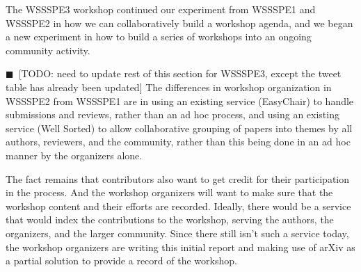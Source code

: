 \documentclass[11pt, oneside]{amsart}
\newcommand{\todo}[1]{{\color{blue}$\blacksquare$~\textsf{[TODO: #1]}}}
\begin{document}
The WSSSPE3 workshop continued our experiment from WSSSPE1 and WSSSPE2 in how we can
collaboratively build a workshop agenda, and we began a new experiment in
how to build a series of workshops into an ongoing community activity.

\todo{need to update rest of this section for WSSSPE3, except the tweet table has already been updated}
The differences in workshop organization in WSSSPE2 from WSSSPE1
are in using an existing service (EasyChair) to handle submissions and reviews,
rather than an ad hoc process, and using an existing service (Well Sorted) to
allow collaborative grouping of papers into themes by all authors, reviewers,
and the community, rather than this being done in an ad hoc manner by the
organizers alone.

The fact remains that contributors also want to get credit for their
participation in the process. And the workshop organizers will want to make
sure that the workshop content and their efforts are recorded. Ideally, there
would be a service that would index the contributions to the
workshop, serving the authors, the organizers, and the larger community. 
Since there still isn't such a service today, the workshop organizers are
writing this initial report and making use of arXiv as a partial solution to
provide a record of the workshop.
\end{document}
